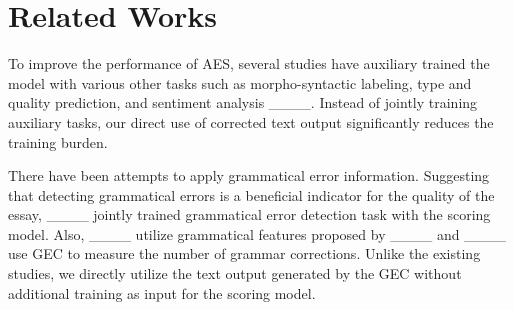 \section{Related Works}


To improve the performance of AES, several studies have auxiliary trained the model with various other tasks such as morpho-syntactic labeling, type and quality prediction, and sentiment analysis ____. Instead of jointly training auxiliary tasks, our direct use of corrected text output significantly reduces the training burden.

There have been attempts to apply grammatical error information. Suggesting that detecting grammatical errors is a beneficial indicator for the quality of the essay, ____ jointly trained grammatical error detection task with the scoring model. Also, ____ utilize grammatical features proposed by ____ and ____ use GEC to measure the number of grammar corrections. Unlike the existing studies, we directly utilize the text output generated by the GEC without additional training as input for the scoring model.
%


